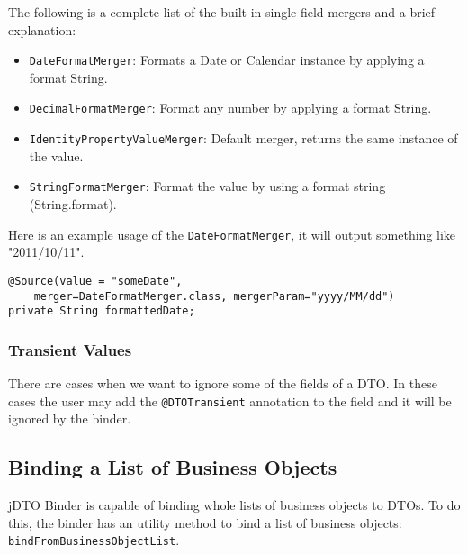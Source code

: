 \documentclass[12pt]{article}
\newcommand{\JDTO}{jDTO Binder }
\begin{document}
The following is a complete list of the built-in single field mergers and a brief explanation:

\begin{itemize}
 \item \texttt{DateFormatMerger}: Formats a Date or Calendar instance by applying a format String.
 \item \texttt{DecimalFormatMerger}: Format any number by applying a format String.
 \item \texttt{IdentityPropertyValueMerger}: Default merger, returns the same instance of the value.
 \item \texttt{StringFormatMerger}: Format the value by using a format string (String.format).
\end{itemize}

Here is an example usage of the \texttt{DateFormatMerger}, it will output something like "2011/10/11".

\begin{verbatim}
@Source(value = "someDate", 
    merger=DateFormatMerger.class, mergerParam="yyyy/MM/dd")
private String formattedDate;
\end{verbatim}

\subsubsection{Transient Values}

There are cases when we want to ignore some of the fields of a DTO. In these cases the user may add the \texttt{@DTOTransient} annotation to the field and it will be ignored by the binder.

\subsection{Binding a List of Business Objects}

\JDTO is capable of binding whole lists of business objects to DTOs. To do this, the binder has an utility method to bind a list of business objects: \texttt{bindFromBusinessObjectList}.
\end{document}
